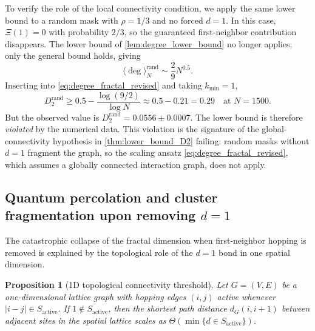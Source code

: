 \documentclass[11pt,a4paper]{article}
\newtheorem{proposition}[theorem]{Proposition}
\begin{document}
To verify the role of the local connectivity condition, we apply the same lower bound to a random mask with $\rho = 1/3$ and no forced $d = 1$. In this case, $\Xi(1) = 0$ with probability $2/3$, so the guaranteed first-neighbor contribution disappears. The lower bound of \cref{lem:degree_lower_bound} no longer applies; only the general bound holds, giving
\begin{equation}
\langle \deg \rangle_N^{\text{rand}} \sim \frac{2}{9} N^{0.5}.
\end{equation}
Inserting into \cref{eq:degree_fractal_revised} and taking $k_{\min} = 1$,
\begin{equation}
D_2^{\text{rand}} \geq 0.5 - \frac{\log(9/2)}{\log N} \approx 0.5 - 0.21 = 0.29 \quad \text{at } N = 1500.
\end{equation}
But the observed value is $D_2^{\text{rand}} = 0.0556 \pm 0.0007$. The lower bound is therefore \emph{violated} by the numerical data. This violation is the signature of the global-connectivity hypothesis in \cref{thm:lower_bound_D2} failing: random masks without $d=1$ fragment the graph, so the scaling ansatz \cref{eq:degree_fractal_revised}, which assumes a globally connected interaction graph, does not apply.

\subsection{Quantum percolation and cluster fragmentation upon removing \texorpdfstring{$d=1$}{d=1}}
\label{subsec:quantum_percolation}

The catastrophic collapse of the fractal dimension when first-neighbor hopping is removed is explained by the topological role of the $d=1$ bond in one spatial dimension.

\begin{proposition}[1D topological connectivity threshold]
\label{prop:connectivity_threshold}
Let $G = (V, E)$ be a one-dimensional lattice graph with hopping edges $(i, j)$ active whenever $|i-j| \in S_{\text{active}}$. If $1 \notin S_{\text{active}}$, then the shortest path distance $d_G(i, i+1)$ between adjacent sites in the spatial lattice scales as $\Theta(\min \{d \in S_{\text{active}}\})$.
\end{proposition}
\end{document}
